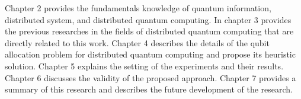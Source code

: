 Chapter 2 provides the fundamentals knowledge of quantum information, distributed system, and distributed quantum computing.
In chapter 3 provides the previous researches in the fields of distributed quantum computing that are directly related to this work.
Chapter 4 describes the details of the qubit allocation problem for distributed quantum computing and propose its heuristic solution.
Chapter 5 explains the setting of the experiments and their results.
Chapter 6 discusses the validity of the proposed approach.
Chapter 7 provides a summary of this research and describes the future development of the research.



